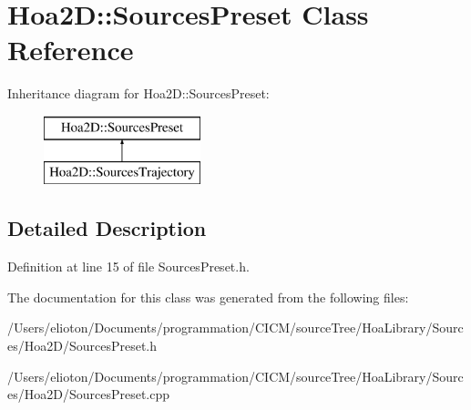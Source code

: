 \hypertarget{class_hoa2_d_1_1_sources_preset}{\section{Hoa2\-D\-:\-:Sources\-Preset Class Reference}
\label{class_hoa2_d_1_1_sources_preset}
}
Inheritance diagram for Hoa2\-D\-:\-:Sources\-Preset\-:\begin{figure}[H]
\begin{center}
\leavevmode
\includegraphics[height=2.000000cm]{class_hoa2_d_1_1_sources_preset}
\end{center}
\end{figure}


\subsection{Detailed Description}


Definition at line 15 of file Sources\-Preset.\-h.



The documentation for this class was generated from the following files\-:\begin{DoxyCompactItemize}
\item 
/\-Users/elioton/\-Documents/programmation/\-C\-I\-C\-M/source\-Tree/\-Hoa\-Library/\-Sources/\-Hoa2\-D/Sources\-Preset.\-h\item 
/\-Users/elioton/\-Documents/programmation/\-C\-I\-C\-M/source\-Tree/\-Hoa\-Library/\-Sources/\-Hoa2\-D/Sources\-Preset.\-cpp\end{DoxyCompactItemize}
